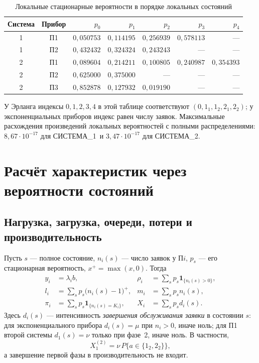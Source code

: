 \documentclass[a4paper,12pt]{article}
\newcommand{\sysone}{СИСТЕМА\_1}
\newcommand{\systwo}{СИСТЕМА\_2}
\newcommand{\ind}{\mathbf1}
\begin{document}
\begin{table}[H]\centering\small
\caption{Локальные стационарные вероятности в порядке локальных состояний}
\begin{tabular}{@{}ccrrrrr@{}}\toprule
Система & Прибор & $p_0$ & $p_1$ & $p_2$ & $p_3$ & $p_4$\\\midrule
1 & П1 & $0{,}050753$ & $0{,}114195$ & $0{,}256939$ & $0{,}578113$ & --- \\
1 & П2 & $0{,}432432$ & $0{,}324324$ & $0{,}243243$ & --- & --- \\
2 & П1 & $0{,}089604$ & $0{,}214211$ & $0{,}100805$ & $0{,}240987$ & $0{,}354393$ \\
2 & П2 & $0{,}625000$ & $0{,}375000$ & --- & --- & --- \\
2 & П3 & $0{,}852878$ & $0{,}127932$ & $0{,}019190$ & --- & --- \\
\bottomrule\end{tabular}
\end{table}
У Эрланга индексы $0,1,2,3,4$ в этой таблице соответствуют $(0,1_1,1_2,2_1,2_2)$; у экспоненциальных приборов индекс равен числу заявок. Максимальные расхождения произведений локальных вероятностей с полными распределениями: $8{,}67\cdot10^{-17}$ для \sysone\ и $3{,}47\cdot10^{-17}$ для \systwo.

\section{Расчёт характеристик через вероятности состояний}
\subsection{Нагрузка, загрузка, очереди, потери и производительность}
Пусть $s$ --- полное состояние, $n_i(s)$ --- число заявок у П$i$, $p_s$ --- его стационарная вероятность, $x^+=\max(x,0)$. Тогда
\begin{align}
y_i&=\lambda_i b,&\rho_i&=\sum_s p_s\ind_{\{n_i(s)>0\}},\\
l_i&=\sum_s p_s\bigl(n_i(s)-1\bigr)^+,&m_i&=\sum_s p_s n_i(s),\\
\pi_i&=\sum_s p_s\ind_{\{n_i(s)=K_i\}},&X_i&=\sum_s p_s d_i(s).
\end{align}
Здесь $d_i(s)$ --- интенсивность \emph{завершения обслуживания заявки} в состоянии $s$: для экспоненциального прибора $d_i(s)=\mu$ при $n_i>0$, иначе ноль; для П1 второй системы $d_1(s)=\nu$ только при фазе~2, иначе ноль. В частности,
\[
X_1^{(2)}=\nu\,P\{a\in\{1_2,2_2\}\},
\]
а завершение первой фазы в производительность не входит.
\end{document}
